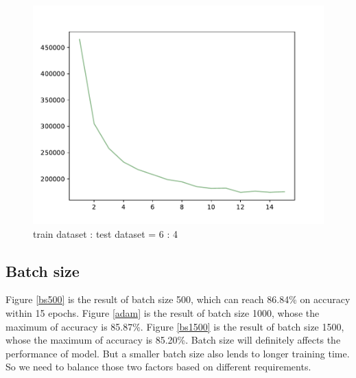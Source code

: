 \documentclass{article}
\begin{document}
\begin{figure}[!h]
{\begin{minipage}{0.21\linewidth}
  \includegraphics[scale=0.23]{imgs/test_loss_4.pdf}
  \end{minipage}
}
\quad
{}
\caption{ train dataset : test dataset = 6 : 4}
\label{tv0.4}
\end{figure}

\subsection{Batch size}
Figure \ref{bs500} is the result of batch size 500, which can reach 86.84\% on accuracy within 15 epochs. Figure \ref{adam} is the result of batch size 1000, whose  the maximum of accuracy is  85.87\%. Figure \ref{bs1500} is the result of batch size 1500, whose  the maximum of accuracy is  85.20\%.  Batch size will definitely affects the performance of model. But a smaller batch size also lends to longer training time. So we need to balance those two factors based on different requirements.
\end{document}
